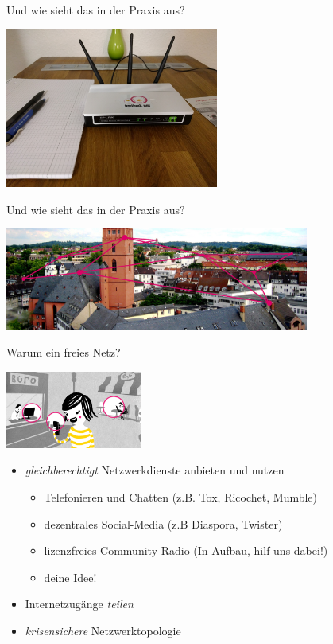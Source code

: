 \documentclass[10pt]{beamer}
\begin{document}
    \begin{frame}{Und wie sieht das in der Praxis aus?}
      \begin{center}
        \includegraphics[width=7cm]{images/homerouter}
      \end{center}
    \end{frame}

    \begin{frame}{Und wie sieht das in der Praxis aus?}
      \begin{center}
        \includegraphics[width=10cm]{images/banner-stadtkirche-darmstadt}
      \end{center}
    \end{frame}

    \begin{frame}{Warum ein freies Netz?}

      \begin{center}
        \includegraphics[width=4.5cm]{images/verbindet}
      \end{center}

      \begin{itemize}
        \item \emph{gleichberechtigt} Netzwerkdienste anbieten und nutzen
        \begin{itemize}
          \item Telefonieren und Chatten (z.B. Tox, Ricochet, Mumble)
          \item dezentrales Social-Media (z.B Diaspora, Twister)
          \item lizenzfreies Community-Radio (In Aufbau, hilf uns dabei!)
          \item deine Idee!
        \end{itemize}
        \item Internetzugänge \emph{teilen}
        \item \emph{krisensichere} Netzwerktopologie
      \end{itemize}
      \vfill
    \end{frame}
\end{document}
